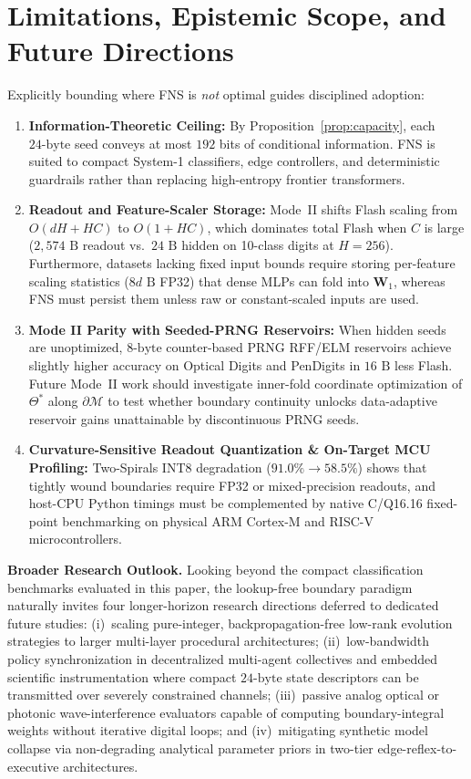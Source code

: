 \section{Limitations, Epistemic Scope, and Future Directions}
\label{sec:limitations}

Explicitly bounding where FNS is \textit{not} optimal guides disciplined adoption:
\begin{enumerate}
    \item \textbf{Information-Theoretic Ceiling:} By Proposition~\ref{prop:capacity}, each $24\text{-byte}$ seed conveys at most $192$ bits of conditional information. FNS is suited to compact System-1 classifiers, edge controllers, and deterministic guardrails rather than replacing high-entropy frontier transformers.
    \item \textbf{Readout and Feature-Scaler Storage:} Mode~II shifts Flash scaling from $O(dH + HC)$ to $O(1 + HC)$, which dominates total Flash when $C$ is large ($2{,}574\text{ B}$ readout vs.\ $24\text{ B}$ hidden on 10-class digits at $H=256$). Furthermore, datasets lacking fixed input bounds require storing per-feature scaling statistics ($8d\text{ B}$ FP32) that dense MLPs can fold into $\mathbf{W}_1$, whereas FNS must persist them unless raw or constant-scaled inputs are used.
    \item \textbf{Mode II Parity with Seeded-PRNG Reservoirs:} When hidden seeds are unoptimized, $8\text{-byte}$ counter-based PRNG RFF/ELM reservoirs achieve slightly higher accuracy on Optical Digits and PenDigits in $16\text{ B}$ less Flash. Future Mode~II work should investigate inner-fold coordinate optimization of $\Theta^*$ along $\partial\mathcal{M}$ to test whether boundary continuity unlocks data-adaptive reservoir gains unattainable by discontinuous PRNG seeds.
    \item \textbf{Curvature-Sensitive Readout Quantization \& On-Target MCU Profiling:} Two-Spirals INT8 degradation ($91.0\% \to 58.5\%$) shows that tightly wound boundaries require FP32 or mixed-precision readouts, and host-CPU Python timings must be complemented by native C/Q16.16 fixed-point benchmarking on physical ARM Cortex-M and RISC-V microcontrollers.
\end{enumerate}

\textbf{Broader Research Outlook.} Looking beyond the compact classification benchmarks evaluated in this paper, the lookup-free boundary paradigm naturally invites four longer-horizon research directions deferred to dedicated future studies: (i)~scaling pure-integer, backpropagation-free low-rank evolution strategies \cite{sarkar2025eggroll} to larger multi-layer procedural architectures; (ii)~low-bandwidth policy synchronization in decentralized multi-agent collectives and embedded scientific instrumentation where compact $24\text{-byte}$ state descriptors can be transmitted over severely constrained channels; (iii)~passive analog optical or photonic wave-interference evaluators capable of computing boundary-integral weights without iterative digital loops; and (iv)~mitigating synthetic model collapse via non-degrading analytical parameter priors in two-tier edge-reflex-to-executive architectures.

